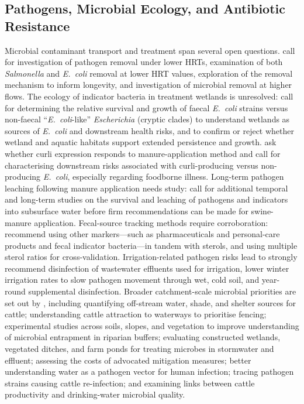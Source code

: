 \documentclass[11pt]{article}
\begin{document}
\subsection{Pathogens, Microbial Ecology, and Antibiotic Resistance}
Microbial contaminant transport and treatment span several open questions. \textcite{Soupir2018} call for investigation of pathogen removal under lower HRTs, examination of both \textit{Salmonella} and \textit{E.\ coli} removal at lower HRT values, exploration of the removal mechanism to inform longevity, and investigation of microbial removal at higher flows. The ecology of indicator bacteria in treatment wetlands is unresolved: \textcite{Stott2023} call for determining the relative survival and growth of faecal \textit{E.\ coli} strains versus non-faecal ``\textit{E.\ coli}-like'' \textit{Escherichia} (cryptic clades) to understand wetlands as sources of \textit{E.\ coli} and downstream health risks, and to confirm or reject whether wetland and aquatic habitats support extended persistence and growth. \textcite{Truhlar2015} ask whether curli expression responds to manure-application method and call for characterising downstream risks associated with curli-producing versus non-producing \textit{E.\ coli}, especially regarding foodborne illness. Long-term pathogen leaching following manure application needs study: \textcite{Malik2004} call for additional temporal and long-term studies on the survival and leaching of pathogens and indicators into subsurface water before firm recommendations can be made for swine-manure application. Fecal-source tracking methods require corroboration: \textcite{Gottschall2013} recommend using other markers---such as pharmaceuticals and personal-care products and fecal indicator bacteria---in tandem with sterols, and using multiple sterol ratios for cross-validation. Irrigation-related pathogen risks lead \textcite{Ding2021} to strongly recommend disinfection of wastewater effluents used for irrigation, lower winter irrigation rates to slow pathogen movement through wet, cold soil, and year-round supplemental disinfection. Broader catchment-scale microbial priorities are set out by \textcite{Collins2007}, including quantifying off-stream water, shade, and shelter sources for cattle; understanding cattle attraction to waterways to prioritise fencing; experimental studies across soils, slopes, and vegetation to improve understanding of microbial entrapment in riparian buffers; evaluating constructed wetlands, vegetated ditches, and farm ponds for treating microbes in stormwater and effluent; assessing the costs of advocated mitigation measures; better understanding water as a pathogen vector for human infection; tracing pathogen strains causing cattle re-infection; and examining links between cattle productivity and drinking-water microbial quality.
\end{document}
